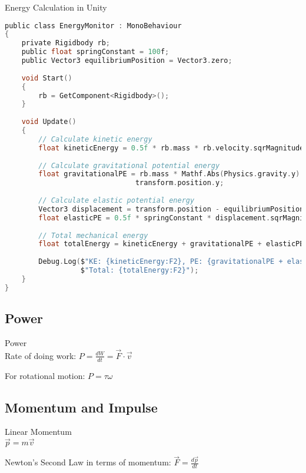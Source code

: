 \begin{code}{Energy Calculation in Unity}\\
\begin{lstlisting}[language=C, style=basesmol]
public class EnergyMonitor : MonoBehaviour 
{
    private Rigidbody rb;
    public float springConstant = 100f;
    public Vector3 equilibriumPosition = Vector3.zero;
    
    void Start() 
    {
        rb = GetComponent<Rigidbody>();
    }
    
    void Update() 
    {
        // Calculate kinetic energy
        float kineticEnergy = 0.5f * rb.mass * rb.velocity.sqrMagnitude;
        
        // Calculate gravitational potential energy
        float gravitationalPE = rb.mass * Mathf.Abs(Physics.gravity.y) * 
                               transform.position.y;
        
        // Calculate elastic potential energy
        Vector3 displacement = transform.position - equilibriumPosition;
        float elasticPE = 0.5f * springConstant * displacement.sqrMagnitude;
        
        // Total mechanical energy
        float totalEnergy = kineticEnergy + gravitationalPE + elasticPE;
        
        Debug.Log($"KE: {kineticEnergy:F2}, PE: {gravitationalPE + elasticPE:F2}, " +
                  $"Total: {totalEnergy:F2}");
    }
}
\end{lstlisting}
\end{code}

\subsection{Power}

\begin{definition}{Power}\\
    Rate of doing work:
    $P = \frac{dW}{dt} = \vec{F} \cdot \vec{v}$
    
    For rotational motion:
    $P = \tau \omega$
\end{definition}

\subsection{Momentum and Impulse}

\begin{definition}{Linear Momentum}\\
    $\vec{p} = m\vec{v}$
    
    Newton's Second Law in terms of momentum:
    $\vec{F} = \frac{d\vec{p}}{dt}$
\end{definition}

